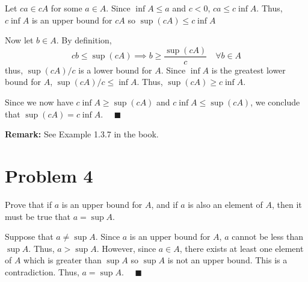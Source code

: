 \documentclass[12pt]{article}
\newcommand{\qed}{\quad \blacksquare}
\begin{document}
\begin{enumerate}
                Let $ca \in cA$ for some $a \in A$. Since $\inf A \leq a$ and $c < 0$, $ca \leq c \inf A$. Thus, $c \inf A$ is an upper bound for $cA$ so $\sup(cA) \leq c \inf A$ 

                Now let $b \in A$. By definition, 
                \[cb \leq \sup(cA) \implies b \geq \frac{\sup(cA)}{c} \quad \forall b \in A\] 
                thus, $\sup(cA)/c$ is a lower bound for $A$. Since $\inf A$ is the greatest lower bound for $A$, $\sup(cA)/c \leq \inf A$. Thus, $\sup(cA) \geq c \inf A$.

                Since we now have $c\inf A \geq \sup(cA)$ and $c \inf A \leq \sup(cA)$, we conclude that $\sup(cA) = c \inf A$. $\qed$
                
            \color{black}
    \end{enumerate}

    \textbf{Remark:} See Example 1.3.7 in the book.
    \pagebreak 

\section*{Problem 4}
    Prove that if $a$ is an upper bound for $A$, and if $a$ is also an element of $A$, then it must be true that $a = \sup A$.

    \color{blue}
        Suppose that $a \neq \sup A$. Since $a$ is an upper bound for $A$, $a$ cannot be less than $\sup A$. Thus, $a > \sup A$. However, since $a \in A$, there exists at least one element of $A$ which is greater than $\sup A$ so $\sup A$ is not an upper bound. This is a contradiction. Thus, $a = \sup A$. $\qed$ 
    \color{black}
\pagebreak 
\end{document}
